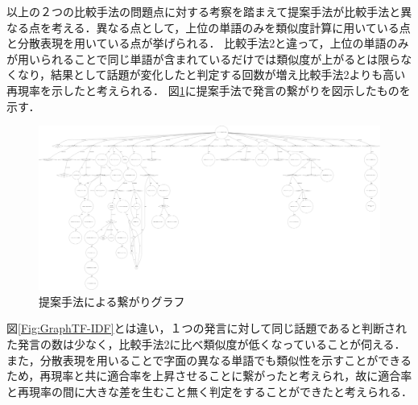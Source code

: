 以上の２つの比較手法の問題点に対する考察を踏まえて提案手法が比較手法と異なる点を考える．異なる点として，上位の単語のみを類似度計算に用いている点と分散表現を用いている点が挙げられる．
比較手法2と違って，上位の単語のみが用いられることで同じ単語が含まれているだけでは類似度が上がるとは限らなくなり，結果として話題が変化したと判定する回数が増え比較手法2よりも高い再現率を示したと考えられる．
図\ref{Fig:GraphFastText}に提案手法で発言の繋がりを図示したものを示す．
\begin{figure}[htbp]
 \begin{center}
  \includegraphics[width=1.1\textwidth]{../images/5.Experiment/Graph=FastText-min.png}
  \caption{提案手法による繋がりグラフ}
  \label{Fig:GraphFastText}
  \vspace{-10pt}
 \end{center}
\end{figure}

図\ref{Fig:GraphTF-IDF}とは違い，１つの発言に対して同じ話題であると判断された発言の数は少なく，比較手法2に比べ類似度が低くなっていることが伺える．
また，分散表現を用いることで字面の異なる単語でも類似性を示すことができるため，再現率と共に適合率を上昇させることに繋がったと考えられ，故に適合率と再現率の間に大きな差を生むこと無く判定をすることができたと考えられる．

